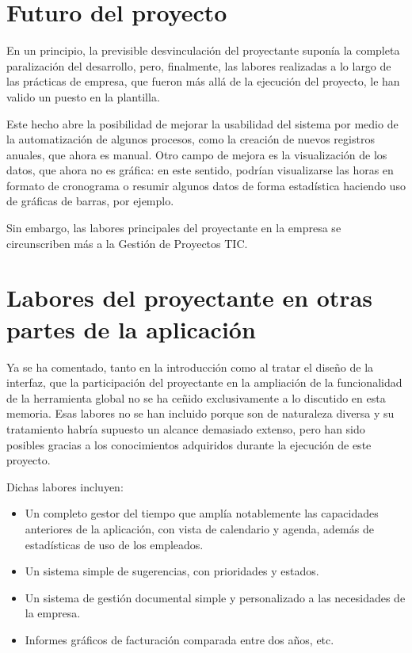 \section{Futuro del proyecto}

En un principio, la previsible desvinculación del proyectante suponía la
completa paralización del desarrollo, pero, finalmente, las labores realizadas
a lo largo de las prácticas de empresa, que fueron más allá de la ejecución del
proyecto, le han valido un puesto en la plantilla.

Este hecho abre la posibilidad de mejorar la usabilidad del sistema por medio
de la automatización de algunos procesos, como la creación de nuevos registros
anuales, que ahora es manual. Otro campo de mejora es la visualización de los
datos, que ahora no es gráfica: en este sentido, podrían visualizarse las horas
en formato de cronograma o resumir algunos datos de forma estadística haciendo
uso de gráficas de barras, por ejemplo.

Sin embargo, las labores principales del proyectante en la empresa se
circunscriben más a la Gestión de Proyectos TIC.

\section{Labores del proyectante en otras partes de la aplicación}

Ya se ha comentado, tanto en la introducción como al tratar el diseño de la
interfaz, que la participación del proyectante en la ampliación de la
funcionalidad de la herramienta global no se ha ceñido exclusivamente a lo
discutido en esta memoria. Esas labores no se han incluido porque son de
naturaleza diversa y su tratamiento habría supuesto un alcance demasiado
extenso, pero han sido posibles gracias a los conocimientos adquiridos durante
la ejecución de este proyecto.

Dichas labores incluyen:

\begin{itemize}
\item Un completo gestor del tiempo que amplía notablemente las capacidades
anteriores de la aplicación, con vista de calendario y agenda, además de
estadísticas de uso de los empleados.
\item Un sistema simple de sugerencias, con prioridades y estados.
\item Un sistema de gestión documental simple y personalizado a las necesidades
de la empresa.
\item Informes gráficos de facturación comparada entre dos años, etc.
\end{itemize}

